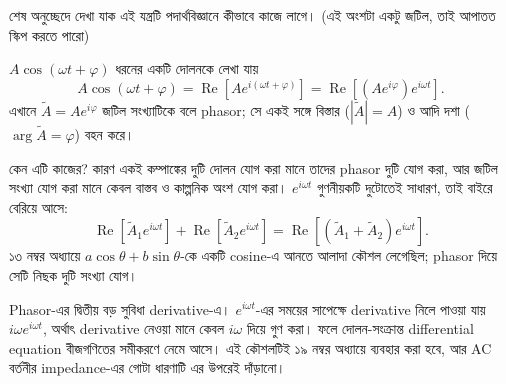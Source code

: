 \documentclass[11pt]{article}
\begin{document}
শেষ অনুচ্ছেদে দেখা যাক এই যন্ত্রটি পদার্থবিজ্ঞানে কীভাবে কাজে লাগে। (এই অংশটা একটু জটিল, তাই আপাতত স্কিপ করতে পারো)

\begin{idea}[Phasor]
$A\cos(\omega t + \varphi)$ ধরনের একটি দোলনকে লেখা যায়
\[
  A\cos(\omega t + \varphi)
  = \operatorname{Re}\left[ A e^{i(\omega t + \varphi)} \right]
  = \operatorname{Re}\left[ \left( Ae^{i\varphi} \right)e^{i\omega t} \right] .
\]
এখানে $\tilde{A} = Ae^{i\varphi}$ জটিল সংখ্যাটিকে বলে phasor; সে একই সঙ্গে
বিস্তার ($|\tilde{A}| = A$) ও আদি দশা ($\arg\tilde{A} = \varphi$) বহন করে।
\end{idea}

কেন এটি কাজের? কারণ একই কম্পাঙ্কের দুটি দোলন যোগ করা মানে তাদের phasor দুটি
যোগ করা, আর জটিল সংখ্যা যোগ করা মানে কেবল বাস্তব ও কাল্পনিক অংশ যোগ করা।
$e^{i\omega t}$ গুণনীয়কটি দুটোতেই সাধারণ, তাই বাইরে বেরিয়ে আসে:
\[
  \operatorname{Re}\left[ \tilde{A}_{1}e^{i\omega t} \right]
  + \operatorname{Re}\left[ \tilde{A}_{2}e^{i\omega t} \right]
  = \operatorname{Re}\left[ \left( \tilde{A}_{1}+\tilde{A}_{2} \right)
    e^{i\omega t} \right] .
\]
১৩ নম্বর অধ্যায়ে $a\cos\theta + b\sin\theta$-কে একটি cosine-এ আনতে
আলাদা কৌশল লেগেছিল; phasor দিয়ে সেটি নিছক দুটি সংখ্যা যোগ।

\begin{center}
\end{center}

\begin{remark}
Phasor-এর দ্বিতীয় বড় সুবিধা derivative-এ। $e^{i\omega t}$-এর সময়ের সাপেক্ষে
derivative নিলে পাওয়া যায় $i\omega e^{i\omega t}$, অর্থাৎ derivative নেওয়া
মানে কেবল $i\omega$ দিয়ে গুণ করা। ফলে দোলন-সংক্রান্ত differential equation
বীজগণিতের সমীকরণে নেমে আসে। এই কৌশলটিই ১৯ নম্বর অধ্যায়ে ব্যবহার করা হবে,
আর AC বর্তনীর impedance-এর গোটা ধারণাটি এর উপরেই দাঁড়ানো।
\end{remark}
\end{document}
